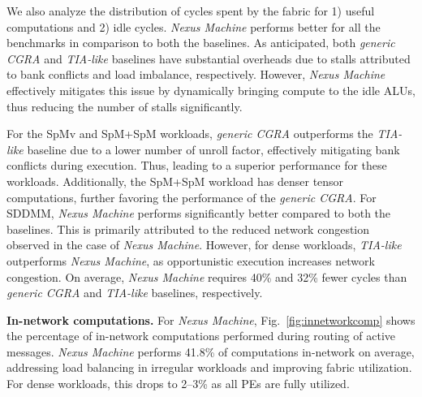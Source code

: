 We also analyze the distribution of cycles spent by the fabric for 1) useful computations and 2) idle cycles. 
\textit{Nexus Machine} performs better for all the benchmarks in comparison to both the baselines.
As anticipated, both \textit{generic CGRA} and \textit{TIA-like} baselines have substantial overheads due to stalls attributed to bank conflicts and load imbalance, respectively. 
However, \textit{Nexus Machine} effectively mitigates this issue by dynamically bringing compute to the idle ALUs, thus reducing the number of stalls significantly. 

For the SpMv and SpM+SpM workloads, \textit{generic CGRA} outperforms the \textit{TIA-like} baseline due to a lower number of unroll factor, effectively mitigating bank conflicts during execution. Thus, leading to a superior performance for these workloads.
Additionally, the SpM+SpM workload has denser tensor computations, further favoring the performance of the \textit{generic CGRA}.
For SDDMM, \textit{Nexus Machine} performs significantly better compared to both the baselines.
This is primarily attributed to the reduced network congestion observed in the case of \textit{Nexus Machine}.
However, for dense workloads, \textit{TIA-like} outperforms \textit{Nexus Machine}, as opportunistic execution increases network congestion.
On average, \textit{Nexus Machine} requires 40\% and 32\% fewer cycles than \textit{generic CGRA} and \textit{TIA-like} baselines, respectively.

{\bf In-network computations.}
For \textit{Nexus Machine}, Fig.~\ref{fig:innetworkcomp} shows the percentage of in-network computations performed during routing of active messages.
\textit{Nexus Machine} performs 41.8\% of computations in-network on average, addressing load balancing in irregular workloads and improving fabric utilization.
For dense workloads, this drops to 2–3\% as all PEs are fully utilized.

